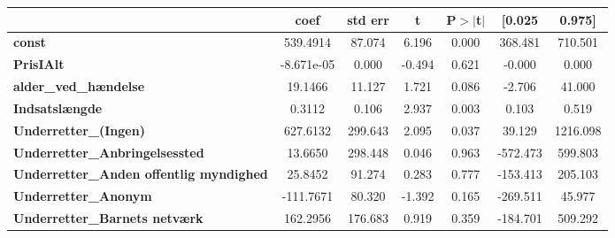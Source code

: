 \begin{center}
\begin{tabular}{lcccccc}
                                                                                                                               & \textbf{coef} & \textbf{std err} & \textbf{t} & \textbf{P$> |$t$|$} & \textbf{[0.025} & \textbf{0.975]}  \\
\midrule
\textbf{const}                                                                                                                 &     539.4914  &       87.074     &     6.196  &         0.000        &      368.481    &      710.501     \\
\textbf{PrisIAlt}                                                                                                              &   -8.671e-05  &        0.000     &    -0.494  &         0.621        &       -0.000    &        0.000     \\
\textbf{alder\_ved\_hændelse}                                                                                                  &      19.1466  &       11.127     &     1.721  &         0.086        &       -2.706    &       41.000     \\
\textbf{Indsatslængde}                                                                                                         &       0.3112  &        0.106     &     2.937  &         0.003        &        0.103    &        0.519     \\
\textbf{Underretter\_(Ingen)}                                                                                                  &     627.6132  &      299.643     &     2.095  &         0.037        &       39.129    &     1216.098     \\
\textbf{Underretter\_Anbringelsessted}                                                                                         &      13.6650  &      298.448     &     0.046  &         0.963        &     -572.473    &      599.803     \\
\textbf{Underretter\_Anden offentlig myndighed}                                                                                &      25.8452  &       91.274     &     0.283  &         0.777        &     -153.413    &      205.103     \\
\textbf{Underretter\_Anonym}                                                                                                   &    -111.7671  &       80.320     &    -1.392  &         0.165        &     -269.511    &       45.977     \\
\textbf{Underretter\_Barnets netværk}                                                                                          &     162.2956  &      176.683     &     0.919  &         0.359        &     -184.701    &      509.292     \\

\end{tabular}
\end{center}
